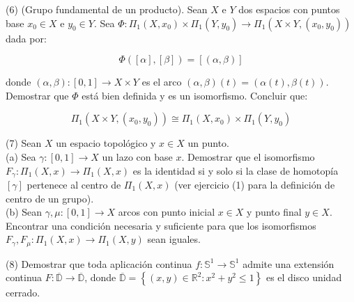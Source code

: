 \documentclass[
  a4paper,
  spanish,
  12pt,
]{scrartcl}
\begin{document}
\begin{ejer}
(6) (Grupo fundamental de un producto). Sean $X$ e $Y$ dos espacios con puntos base $x_{0} \in X$ e $y_{0} \in Y$. Sea $\Phi: \Pi_{1}\left(X, x_{0}\right) \times \Pi_{1}\left(Y, y_{0}\right) \rightarrow \Pi_{1}\left(X \times Y,\left(x_{0}, y_{0}\right)\right)$ dada por:


$$
\Phi([\alpha],[\beta])=[(\alpha, \beta)]
$$

donde $(\alpha, \beta):[0,1] \rightarrow X \times Y$ es el arco $(\alpha, \beta)(t)=(\alpha(t), \beta(t))$. Demostrar que $\Phi$ está bien definida y es un isomorfismo. Concluir que:

$$
\Pi_{1}\left(X \times Y,\left(x_{0}, y_{0}\right)\right) \cong \Pi_{1}\left(X, x_{0}\right) \times \Pi_{1}\left(Y, y_{0}\right)
$$
\end{ejer}


\begin{ejer}
(7) Sean $X$ un espacio topológico y $x \in X$ un punto.\\
(a) Sea $\gamma:[0,1] \rightarrow X$ un lazo con base $x$. Demostrar que el isomorfismo $F_{\gamma}: \Pi_{1}(X, x) \rightarrow \Pi_{1}(X, x)$ es la identidad si y solo si la clase de homotopía $[\gamma]$ pertenece al centro de $\Pi_{1}(X, x)$ (ver ejercicio (1) para la definición de centro de un grupo).\\
(b) Sean $\gamma, \mu:[0,1] \rightarrow X$ arcos con punto inicial $x \in X$ y punto final $y \in X$. Encontrar una condición necesaria y suficiente para que los isomorfismos $F_{\gamma}, F_{\mu}: \Pi_{1}(X, x) \rightarrow \Pi_{1}(X, y)$ sean iguales.\\
\end{ejer}

\begin{ejer}
(8) Demostrar que toda aplicación continua $f: \mathbb{S}^{1} \rightarrow \mathbb{S}^{1}$ admite una extensión continua $F: \overline{\mathbb{D}} \rightarrow \overline{\mathbb{D}}$, donde $\overline{\mathbb{D}}=\left\{(x, y) \in \mathbb{R}^{2}: x^{2}+y^{2} \leq 1\right\}$ es el disco unidad cerrado.\\
\end{ejer}
\end{document}
